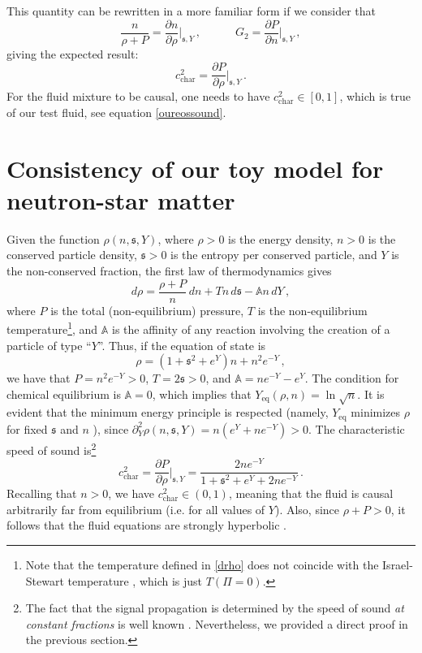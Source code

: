 \documentclass[aps,prl,noshowpacs,noshowkeys,floatfix,superscriptaddress,singlecolum,nofootinbib]{revtex4-2}
\newcommand{\spc}{\quad \quad \quad}
\theoremstyle{definition}
\theoremstyle{theorem}
\begin{document}
This quantity can be rewritten in a more familiar form if we consider that
\begin{equation}
  \dfrac{n}{\rho+P}= \dfrac{\partial n}{\partial \rho}\bigg|_{\mathfrak{s},Y} \, , \spc  G_2 = \dfrac{\partial P}{\partial n}\bigg|_{\mathfrak{s},Y} \, , 
\end{equation}
giving the expected result:
\begin{equation}
    c_{\text{char}}^2  = \dfrac{\partial P}{\partial \rho}\bigg|_{\mathfrak{s},Y}  \, .
\end{equation}
For the fluid mixture to be causal, one needs to have $c_\text{char}^2\in [0,1]$, which is true of our test fluid, see equation \eqref{oureossound}.



\newpage
\section{Consistency of our toy model for neutron-star matter}


Given the function $\rho(n,\mathfrak{s},Y)$, where $\rho>0$ is the energy density, $n>0$ is the conserved particle density, $\mathfrak{s}>0$ is the entropy per conserved particle, and $Y$ is the non-conserved fraction, the first law of thermodynamics gives 
\begin{equation}\label{drho}
    d\rho = \dfrac{\rho+P}{n} \, dn +Tn \, d\mathfrak{s}-\mathbb{A}n \, dY \, ,
\end{equation}
where $P$ is the total (non-equilibrium) pressure, $T$ is the non-equilibrium temperature\footnote{Note that the temperature defined in \eqref{drho} does not coincide with the Israel-Stewart temperature \cite{Israel_Stewart_1979}, which is just $T(\Pi=0)$.}, and $\mathbb{A}$ is the affinity of any reaction involving the creation of a particle of type ``$Y$''. Thus, if the equation of state is 
\begin{equation}\label{rhorho}
    \rho = (1+\mathfrak{s}^2+e^{Y})n + n^2 e^{-Y} \, ,
\end{equation}
we have that $P=n^2 e^{-Y}>0$, $T=2\mathfrak{s}>0$, and $\mathbb{A}=ne^{-Y}-e^Y$. The condition for chemical equilibrium is $\mathbb{A}=0$, which implies that $Y_{\text{eq}}(\rho,n)=\ln\sqrt{n}$. It is evident that the minimum energy principle is respected (namely, $Y_{\text{eq}}$ minimizes $\rho$ for fixed $\mathfrak{s}$ and $n$ \cite{Callen_book}), since $\partial^2_Y \rho(n,\mathfrak{s},Y)=n(e^Y+ne^{-Y})>0$.
The characteristic speed of sound is\footnote{The fact that the signal propagation is determined by the speed of sound \textit{at constant fractions} is well known \cite{Camelio2022}. Nevertheless, we provided a direct proof in the previous section.}
\begin{equation}\label{oureossound}
    c_{\text{char}}^2 = \dfrac{\partial P}{\partial \rho}\bigg|_{\mathfrak{s},Y} = \dfrac{2ne^{-Y}}{1+\mathfrak{s}^2+e^Y+2ne^{-Y}} \, .
\end{equation}
Recalling that $n>0$, we have $c_{\text{char}}^2 \in (0,1)$, meaning that the fluid is causal arbitrarily far from equilibrium (i.e. for all values of $Y$). Also, since $\rho+P>0$, it follows that the fluid equations are strongly hyperbolic \cite{GerochLindblom1990,Causality_bulk}.
\end{document}
